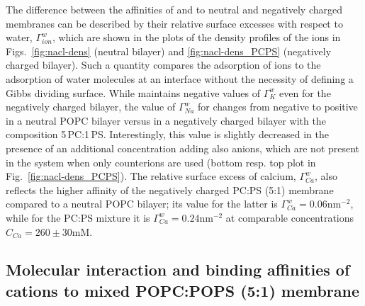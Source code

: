 \documentclass[journal=jpcbfk,manuscript=article]{achemso}
\begin{document}
The difference between the affinities of  and  to neutral and negatively charged membranes
can be described by their relative surface excesses with respect to water, $\Gamma ^{w} _{ion}$, 
which are shown in the plots of the density profiles of the ions in Figs.~\ref{fig:nacl-dens} (neutral bilayer)
and \ref{fig:nacl-dens_PCPS} (negatively charged bilayer). 
Such a quantity compares the adsorption of ions to the adsorption of water molecules at an interface 
without the necessity of defining a Gibbs dividing surface. \citep{melcr18, chattorajBOOK}
While  maintains negative values of $\Gamma^{w}_{K}$ even for the negatively charged bilayer,
the value of $\Gamma^{w}_{Na}$ for  changes from negative to positive
in a neutral POPC bilayer versus in a negatively charged bilayer with the composition 5\,PC:1\,PS.
Interestingly, this value is slightly decreased in the presence of an additional  concentration adding also  anions, 
which are not present in the system when only counterions are used
(bottom resp. top plot in Fig.~\ref{fig:nacl-dens_PCPS}). 
The relative surface excess of calcium, $\Gamma^{w}_{Ca}$, also reflects
the higher affinity of the negatively charged PC:PS (5:1) membrane compared to a neutral POPC bilayer; 
its value for the latter is       $\Gamma^{w}_{Ca} = 0.06\mathrm{nm^{-2}}$, 
while for the PC:PS mixture it is $\Gamma^{w}_{Ca} = 0.24\mathrm{nm^{-2}}$
at comparable concentrations $C _{Ca} = 260\pm 30 \mathrm{mM} $. 


 





 
 


\subsection{Molecular interaction and binding affinities of  cations to mixed POPC:POPS (5:1) membrane} 
\label{section:lip-ion_ca}
\end{document}
